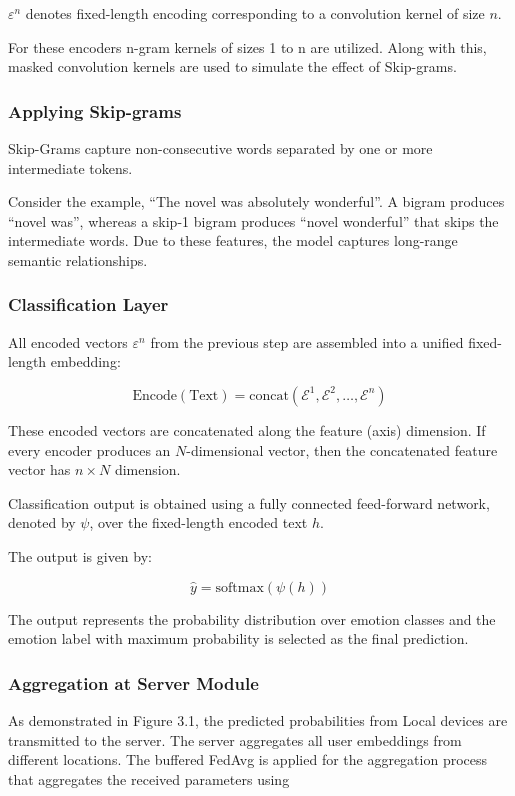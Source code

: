 \noindent $\varepsilon^{n}$ denotes fixed-length encoding corresponding to a convolution kernel of size $n$.

For these encoders  n-gram kernels of sizes 1 to n are utilized. Along with this, masked convolution kernels are used to simulate the effect of Skip-grams.

\subsubsection{Applying Skip-grams}
Skip-Grams capture non-consecutive words separated by one or more intermediate tokens.

Consider the example, “The novel was absolutely wonderful”. A bigram produces “novel was”, whereas a skip-1 bigram produces “novel wonderful” that skips the intermediate words. Due to these features, the model captures long-range semantic relationships.

\subsubsection{Classification Layer}
All encoded vectors $\varepsilon^{n}$ from the previous step are assembled into a unified fixed-length embedding:

\begin{equation}
  \text{Encode}(\text{Text}) = \text{concat}(\mathcal{E}^{1}, \mathcal{E}^{2}, \ldots, \mathcal{E}^{n})
  \label{eq:ch3_3_7}
\end{equation}

\noindent These encoded vectors are concatenated along the feature (axis) dimension. If every encoder produces an $N$-dimensional vector, then the concatenated feature vector has $n \times N$ dimension.

Classification output is obtained using a fully connected feed-forward network, denoted by $\psi$, over the fixed-length encoded text $h$.

The output is given by:

\begin{equation}
  \label{eq:ch3_3_8}
  \hat{y} = \text{softmax}(\psi(h))
\end{equation}

The output represents the probability distribution over emotion classes and the emotion label with maximum probability is selected as the final prediction.

\subsubsection{Aggregation at Server Module}
As demonstrated in Figure 3.1, the predicted probabilities from Local devices are transmitted to the server. The server aggregates all user embeddings from different locations. The buffered FedAvg is applied for the aggregation process that aggregates the received parameters using

